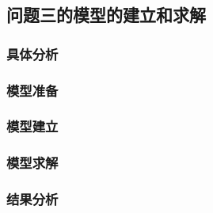 \subsection{问题三的模型的建立和求解}

\subsubsection{具体分析}

\subsubsection{模型准备}

\subsubsection{模型建立}

\subsubsection{模型求解}

\subsubsection{结果分析}
